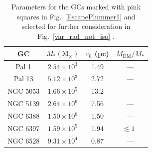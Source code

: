 \documentclass[aps,floatfix,prd,showpacs]{revtex4}
\newcommand{\MDM}{M_{\mathrm{DM}}}
\begin{document}
%
%
%
\begin{table}
\begin{tabular}{ | c | c | c | c |}
	\hline
	GC & $M_* (\mathrm{M}_\odot)$ & $r_0$ (pc) & $\MDM/M_*$ \\
	\hline
  	Pal 1 & $2.54\times10^3$ & 1.49 & ---\\
  	Pal 13 & $5.12\times10^3$ & 2.72 & ---\\
	NGC 5053 & $1.66\times10^5$ & 13.2 & ---\\
	NGC 5139 & $2.64\times10^6$ & 7.56 & ---\\
	NGC 6388 & $1.50\times10^6$ & 1.50& ---\\
	NGC 6397 & $1.59\times10^5$ & 1.94 & $\lesssim 1$\ \cite{Shin}\\
	NGC 6528 & $9.31\times10^4$ & 0.87 & ---\\
	\hline
\end{tabular}
\caption{Parameters for the GCs marked with pink squares in Fig.~\ref{EscapePlummer1} and selected for further consideration in Fig.~\ref{var_rad_not_iso} \cite{Harris}.}
\label{table_not_iso}
\end{table}
\end{document}
